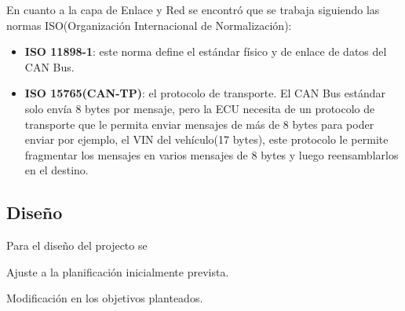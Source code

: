 En cuanto a la capa de Enlace y Red se encontró que se trabaja siguiendo las normas ISO(Organización Internacional de Normalización):
\begin{itemize}
    \item \textbf{ISO 11898-1}: este norma define el estándar físico y de enlace de datos del CAN Bus.
    \item \textbf{ISO 15765(CAN-TP)}: el protocolo de transporte. El CAN Bus estándar solo envía 8 bytes por mensaje, pero la ECU necesita de un protocolo de transporte que le permita enviar mensajes de más de 8 bytes para poder enviar por ejemplo, el VIN del vehículo(17 bytes), este protocolo le permite fragmentar los mensajes en varios mensajes de 8 bytes y luego reensamblarlos en el destino.
\end{itemize}

\subsection{Diseño}

Para el diseño del projecto se

Ajuste a la planificación inicialmente prevista.

Modificación en los objetivos planteados.
